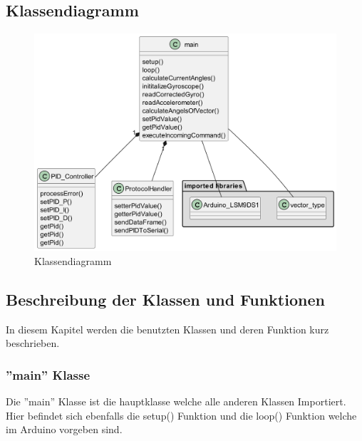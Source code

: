 \subsection{Klassendiagramm}
\begin{figure}[H]
  \begin{center}
    \includegraphics[width=0.8\linewidth]{content/diagrams/out/class/classdiagram.png}
    \caption{Klassendiagramm}
  \end{center}
\end{figure}

\subsection{Beschreibung der Klassen und Funktionen}
In diesem Kapitel werden die benutzten Klassen und deren Funktion kurz beschrieben.
\subsubsection{''main'' Klasse}
Die ''main'' Klasse ist die hauptklasse welche alle anderen Klassen Importiert. Hier befindet sich ebenfalls die setup() Funktion und die loop() Funktion welche im Arduino vorgeben sind.

